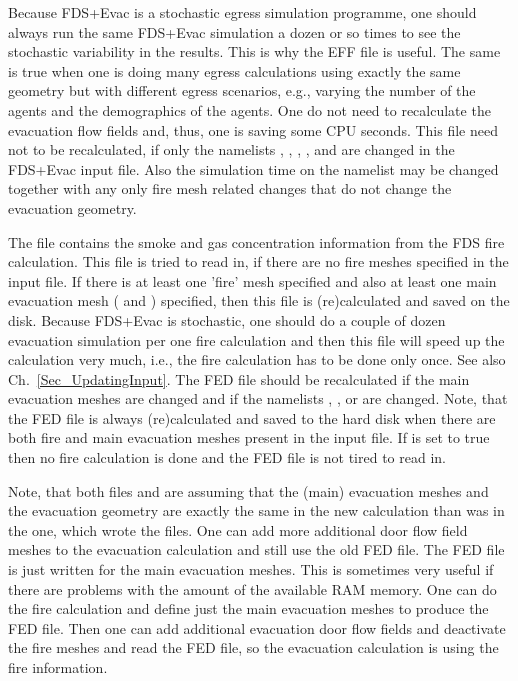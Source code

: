 \documentclass[12pt,a4paper,final,twoside]{stylevk}
\begin{document}
Because FDS+Evac is a stochastic egress simulation programme, one
should always run the same FDS+Evac simulation a dozen or so times to
see the stochastic variability in the results.  This is why the EFF
file is useful.  The same is true when one is doing many egress
calculations using exactly the same geometry but with different egress
scenarios, e.g., varying the number of the agents and the
demographics of the agents.  One do not need to recalculate the
evacuation flow fields and, thus, one is saving some CPU seconds.
This file need not to be recalculated, if only the namelists
, , , , 
and  are changed in the FDS+Evac input file.  Also the
simulation time  on the  namelist may be
changed together with any only fire mesh related changes that do not
change the evacuation geometry.


The file  contains the smoke and gas
concentration information from the FDS fire calculation.  This file is
tried to read in, if there are no fire meshes specified in the input
file.  If there is at least one 'fire' mesh specified and also at
least one main evacuation mesh ( and
)  specified, then this file is
(re)calculated and saved on the disk.  Because FDS+Evac is stochastic,
one should do a couple of dozen evacuation simulation per one fire
calculation and then this file will speed up the calculation very
much, i.e., the fire calculation has to be done only once.  See
also Ch.~\ref{Sec_UpdatingInput}.  The FED file should be recalculated
if the main evacuation meshes are changed and if the namelists
, , or  are changed.  Note, that
the FED file is always (re)calculated and saved to the hard disk when
there are both fire and main evacuation meshes present in the input
file.  If  is set to true then no fire
calculation is done and the FED file is not tired to read in.


Note, that both files  and
 are assuming that the (main) evacuation meshes
and the evacuation geometry are exactly the same in the new
calculation than was in the one, which wrote the files.  One can add
more additional door flow field meshes to the evacuation calculation
and still use the old FED file.  The FED file is just written for the
main evacuation meshes.  This is sometimes very useful if there are
problems with the amount of the available RAM memory.  One can do the
fire calculation and define just the main evacuation meshes to produce
the FED file.  Then one can add additional evacuation door flow fields
and deactivate the fire meshes and read the FED file, so the
evacuation calculation is using the fire information.
\end{document}
